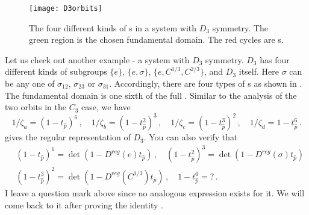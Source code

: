 \begin{figure}[h]
  \centering
  \texttt{[image: D3orbits]}
  \caption[Orbits in a system with $D_3$ symmetry.]{
    The four different kinds of \po s in a system with
    $D_3$ symmetry.
    The green region is the chosen fundamental domain.
    The red cycles are \po s.
  }
  \label{fig:D3orbits}
\end{figure}

Let us check out another example - a system with $D_3$ symmetry.
$D_3$ has four different kinds of subgroups $\{e\}$, $\{e, \sigma\}$,
$\{e, C^{1/3}, C^{2/3}\}$, and $D_3$ itself. Here $\sigma$ can be
any one of $\sigma_{12}$, $\sigma_{23}$ or $\sigma_{31}$. Accordingly,
there are four types of \po s as shown in .
The fundamental domain is one sixth of the full \statesp.
Similar to the analysis of the two orbits in the $C_3$ case, we have
\[
  1/\zeta_a = (1 - t_{\hat{p}})^6
  \,,\quad
  1/\zeta_b = (1 - t_{\hat{p}}^2)^3
  \,,\quad
  1/\zeta_c = (1 - t_{\hat{p}}^3)^2
  \,,\quad
  1/\zeta_d = 1 - t_{\hat{p}}^6
  \,.
\]
 gives the regular representation of $D_3$.
You can also verify that
\begin{align*}
   & (1 - t_{\hat{p}})^6 = \det(1 - D^{reg}(e)t_{\hat{p}}) \,, \quad
     (1 - t_{\hat{p}}^2)^3 = \det(1 - D^{reg}(\sigma)t_{\hat{p}}) \\
   & (1 - t_{\hat{p}}^3)^2 = \det(1 - D^{reg}(C^{1/3})t_{\hat{p}})\,,\quad
     1 - t_{\hat{p}}^6 = ?
     \,.
\end{align*}
I leave a question mark above since no analogous expression exists for it.
We will come back to it after proving
the identity .

